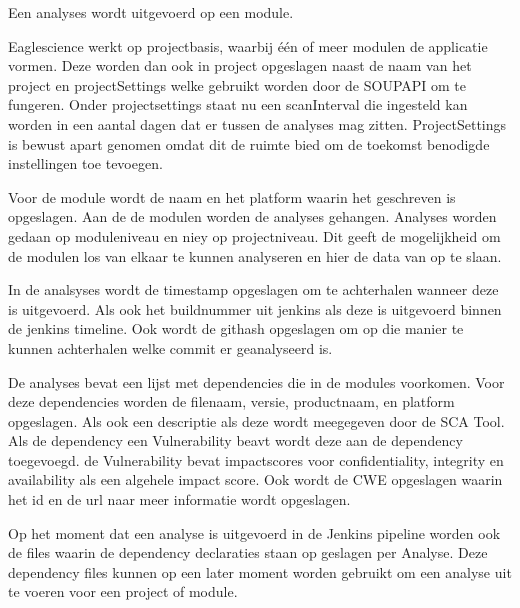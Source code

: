 Een analyses wordt uitgevoerd op een module.


Eaglescience werkt op projectbasis, waarbij één of meer modulen de applicatie vormen. Deze worden dan ook in project opgeslagen naast de naam van het project en projectSettings welke gebruikt worden door de SOUPAPI om te fungeren. Onder projectsettings staat nu een scanInterval die ingesteld kan worden in een aantal dagen dat er tussen de analyses mag zitten. ProjectSettings is bewust apart genomen omdat dit de ruimte bied om de toekomst benodigde instellingen toe tevoegen.

Voor de module wordt de naam en het platform waarin het geschreven is opgeslagen. Aan de de modulen worden de analyses gehangen. Analyses worden gedaan op moduleniveau en niey op projectniveau. Dit geeft de mogelijkheid om de modulen los van elkaar te kunnen analyseren en hier de data van op te slaan.

In de analsyses wordt de timestamp opgeslagen om te achterhalen wanneer deze is uitgevoerd. Als ook het buildnummer uit jenkins als deze is uitgevoerd binnen de jenkins timeline. Ook wordt de githash opgeslagen om op die manier te kunnen achterhalen welke commit er geanalyseerd is.

De analyses bevat een lijst met dependencies die in de modules voorkomen. Voor deze dependencies worden de filenaam, versie, productnaam, en platform opgeslagen. Als ook een descriptie als deze wordt meegegeven door de SCA Tool. Als de dependency een Vulnerability beavt wordt deze aan de dependency toegevoegd. de Vulnerability bevat impactscores voor confidentiality, integrity en availability als een algehele impact score. Ook wordt de CWE opgeslagen waarin het id en de url naar meer informatie wordt opgeslagen.

Op het moment dat een analyse is uitgevoerd in de Jenkins pipeline worden ook de files waarin de dependency declaraties staan op geslagen per Analyse. Deze dependency files kunnen op een later moment worden gebruikt om een analyse uit te voeren voor een project of module.

